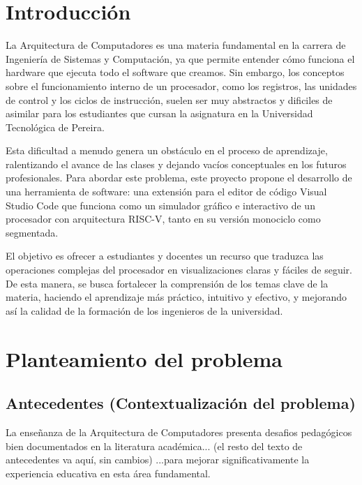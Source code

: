 \documentclass[12pt, letterpaper]{article} %
\begin{document}
\tableofcontents %






\newpage 
\section{Introducción}

La Arquitectura de Computadores es una materia fundamental en la carrera de Ingeniería de Sistemas y Computación, ya que permite entender cómo funciona el hardware que ejecuta todo el software que creamos. Sin embargo, los conceptos sobre el funcionamiento interno de un procesador, como los registros, las unidades de control y los ciclos de instrucción, suelen ser muy abstractos y dificiles de asimilar para los estudiantes que cursan la asignatura en la Universidad Tecnológica de Pereira.

Esta dificultad a menudo genera un obstáculo en el proceso de aprendizaje, ralentizando el avance de las clases y dejando vacíos conceptuales en los futuros profesionales. Para abordar este problema, este proyecto propone el desarrollo de una herramienta de software: una extensión para el editor de código Visual Studio Code que funciona como un simulador gráfico e interactivo de un procesador con arquitectura RISC-V, tanto en su versión monociclo como segmentada.

El objetivo es ofrecer a estudiantes y docentes un recurso que traduzca las operaciones complejas del procesador en visualizaciones claras y fáciles de seguir. De esta manera, se busca fortalecer la comprensión de los temas clave de la materia, haciendo el aprendizaje más práctico, intuitivo y efectivo, y mejorando así la calidad de la formación de los ingenieros de la universidad.




\section{Planteamiento del problema}

\subsection{Antecedentes (Contextualización del problema)}
La enseñanza de la Arquitectura de Computadores presenta desafios pedagógicos bien documentados en la literatura académica... (el resto del texto de antecedentes va aquí, sin cambios) ...para mejorar significativamente la experiencia educativa en esta área fundamental.
\end{document}
